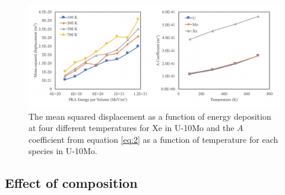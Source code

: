 \documentclass[review]{elsarticle}
\begin{document}
\begin{figure}[h]
 \centering
 \includegraphics[width=1.0\textwidth]{6_msdT.png} 
 \caption{The mean squared displacement as a function of energy deposition at four different temperatures for Xe in U-10Mo and the $A$ coefficient from equation \ref{eq:2} as a function of temperature for each species in U-10Mo. }
 \label{fig:msdT}
\end{figure}

\FloatBarrier

\subsection{Effect of composition}
\end{document}
